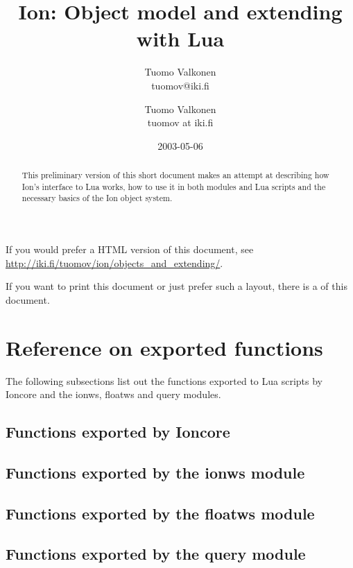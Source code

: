 \documentclass[english,a4paper,11pt,oldtoc]{artikel3}
\title{Ion: Object model and extending with Lua}
\author{Tuomo Valkonen \\ tuomov@iki.fi}
\author{Tuomo Valkonen \\ tuomov at iki.fi}
\date{2003-05-06}
\begin{document}
\maketitle

\begin{abstract}
This preliminary version of this short document makes
an attempt at
describing how Ion's interface to Lua works, how to use it in both
modules and Lua scripts and the necessary basics of the Ion object
system.
\end{abstract}

    If you would prefer a HTML version of this document, see
    \url{http://iki.fi/tuomov/ion/objects_and_extending/}.
\begin{htmlonly}
    If you want to print this document or just prefer such a layout,
    there is a
    of this document.
\end{htmlonly}

\tableofcontents







\section{Reference on exported functions}
\label{sec:exports}

The following subsections list out the functions exported to Lua scripts
by Ioncore and the ionws, floatws and query modules.

\subsection{Functions exported by Ioncore}



\subsection{Functions exported by the ionws module}



\subsection{Functions exported by the floatws module}



\subsection{Functions exported by the query module}



\printindex
\end{document}

